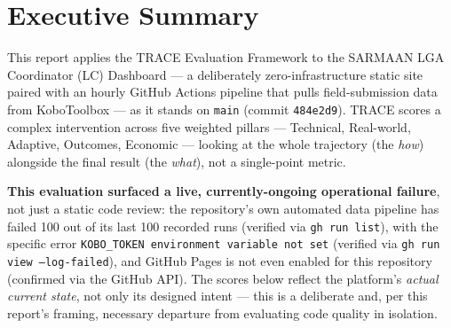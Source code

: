 \documentclass[12pt, a4paper]{article}
\begin{document}
\tableofcontents
\clearpage

\section{Executive Summary}

This report applies the TRACE Evaluation Framework to the SARMAAN LGA Coordinator (LC) Dashboard --- a deliberately zero-infrastructure static site paired with an hourly GitHub Actions pipeline that pulls field-submission data from KoboToolbox --- as it stands on \texttt{main} (commit \texttt{484e2d9}). TRACE scores a complex intervention across five weighted pillars --- Technical, Real-world, Adaptive, Outcomes, Economic --- looking at the whole trajectory (the \emph{how}) alongside the final result (the \emph{what}), not a single-point metric.

\textbf{This evaluation surfaced a live, currently-ongoing operational failure}, not just a static code review: the repository's own automated data pipeline has failed 100 out of its last 100 recorded runs (verified via \texttt{gh run list}), with the specific error \texttt{KOBO\_TOKEN environment variable not set} (verified via \texttt{gh run view --log-failed}), and GitHub Pages is not even enabled for this repository (confirmed via the GitHub API). The scores below reflect the platform's \emph{actual current state}, not only its designed intent --- this is a deliberate and, per this report's framing, necessary departure from evaluating code quality in isolation.
\end{document}
